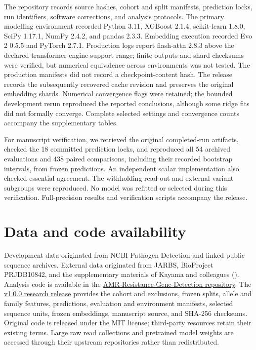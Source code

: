 \documentclass[
  american,
  11pt,
]{article}
\begin{document}
The repository records source hashes, cohort and split manifests,
prediction locks, run identifiers, software corrections, and analysis
protocols. The primary modelling environment recorded Python 3.11,
XGBoost 2.1.4, scikit-learn 1.8.0, SciPy 1.17.1, NumPy 2.4.2, and pandas
2.3.3. Embedding execution recorded Evo 2 0.5.5 and PyTorch 2.7.1.
Production logs report flash-attn 2.8.3 above the declared
transformer-engine support range; finite outputs and shard checksums
were verified, but numerical equivalence across environments was not
tested. The production manifests did not record a checkpoint-content
hash. The release records the subsequently recovered cache revision and
preserves the original embedding shards. Numerical convergence flags
were retained; the bounded development rerun reproduced the reported
conclusions, although some ridge fits did not formally converge.
Complete selected settings and convergence counts accompany the
supplementary tables.

For manuscript verification, we retrieved the original completed-run
artifacts, checked the 18 committed prediction locks, and reproduced all
54 archived evaluations and 438 paired comparisons, including their
recorded bootstrap intervals, from frozen predictions. An independent
scalar implementation also checked essential agreement. The withholding
read-out and external variant subgroups were reproduced. No model was
refitted or selected during this verification. Full-precision results
and verification scripts accompany the release.

\section{Data and code availability}\label{data-and-code-availability}

Development data originated from NCBI Pathogen Detection and linked
public sequence archives. External data originated from JARBS,
BioProject PRJDB10842, and the supplementary materials of Kayama and
colleagues (). Analysis
code is available in the
\href{https://github.com/Sekiromike/AMR-Resistance-Gene-Detection}{AMR-Resistance-Gene-Detection
repository}. The
\href{https://github.com/Sekiromike/AMR-Resistance-Gene-Detection/releases/tag/v1.0.0}{v1.0.0
research release} provides the cohort and exclusions, frozen splits,
allele and family features, predictions, evaluation and environment
manifests, selected sequence units, frozen embeddings, manuscript
source, and SHA-256 checksums. Original code is released under the MIT
license; third-party resources retain their existing terms. Large raw
read collections and pretrained model weights are accessed through their
upstream repositories rather than redistributed.
\end{document}
